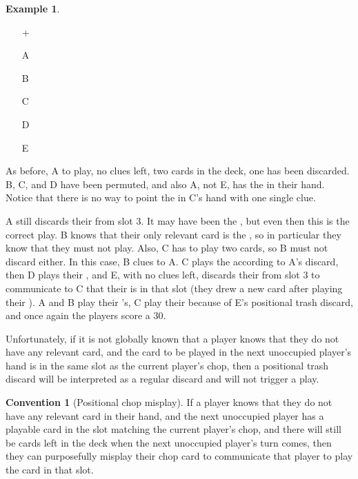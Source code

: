 \documentclass[a4paper]{article}
\theoremstyle{plain}
\theoremstyle{definition}
\newtheorem{example}[theorem]{Example}
\newtheorem{convention}[theorem]{Convention}
\begin{document}
\begin{example}	\hfill \\
	\begin{minipage}{0.45\textwidth}
		\begin{itemize}
			\item[\Large +]      
			\item[\Large A]    
			\item[\Large B]    
			\item[\Large C]    
			\item[\Large D]    
			\item[\Large E]    
		\end{itemize}
	\end{minipage}%
	\begin{minipage}{0.55\textwidth}		
		As before, A to play, no clues left, two cards in the deck, one  has been discarded. B, C, and D have been permuted, and also A, not E, has the  in their hand. Notice that there is no way to point the  in C's hand with one single clue.
			
		A still discards their  from slot 3. It may have been the , but even then this is the correct play. B knows that their only relevant card is the , so in particular they know that they must not play. Also, C has to play two cards, so B must not discard either. In this case, B clues  to A. C plays the  according to A's discard, then D plays their , and E, with no clues left, discards their  from slot 3 to communicate to C that their  is in that slot (they drew a new card after playing their ). A and B play their 's, C play their  because of E's positional trash discard, and once again the players score a 30.
	\end{minipage}
\end{example} \vspace{0.15 cm}

Unfortunately, if it is not globally known that a player knows that they do not have any relevant card, and the card to be played in the next unoccupied player's hand is in the same slot as the current player's chop, then a positional trash discard will be interpreted as a regular discard and will not trigger a play.

\begin{convention}[Positional chop misplay]
	If a player knows that they do not have any relevant card in their hand, and the next unoccupied player has a playable card in the slot matching the current player's chop, and there will still be cards left in the deck when the next unoccupied player's turn comes, then they can purposefully misplay their chop card to communicate that player to play the card in that slot.
\end{convention}
\end{document}
